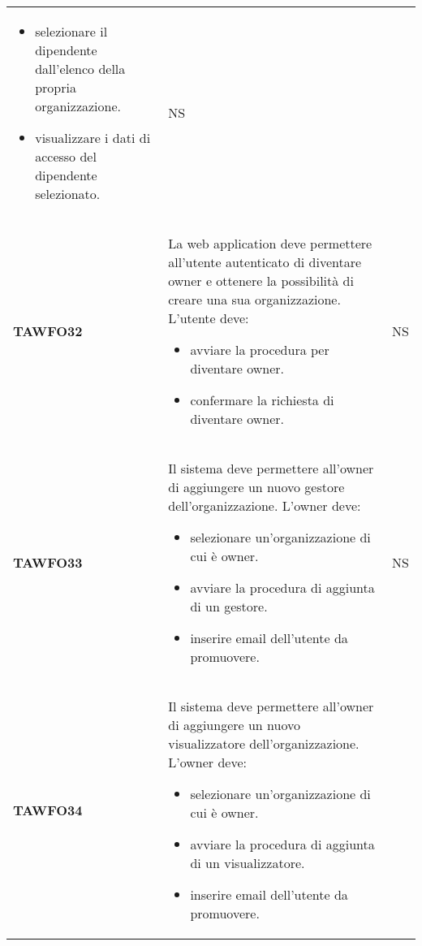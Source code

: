 \documentclass[../piano-di-qualifica.tex]{subfiles}
\begin{document}
\begin{centering}
\begin{longtable}[H]{>{\centering\bfseries}m{3cm} >{}p{10cm} >{\centering\arraybackslash}m{3cm}}
                        \begin{itemize}
                          \item selezionare il dipendente dall'elenco della propria organizzazione.
                          \item visualizzare i dati di accesso del dipendente selezionato.
                        \end{itemize}
                      & NS \\
        TAWFO32       & La web application deve permettere all'utente autenticato di diventare owner e ottenere la possibilità di creare una sua organizzazione. \newline
                        L'utente deve:
                        \begin{itemize}
                          \item avviare la procedura per diventare owner.
                          \item confermare la richiesta di diventare owner.
                        \end{itemize}
                      & NS \\
        TAWFO33       & Il sistema deve permettere all'owner di aggiungere un nuovo gestore dell'organizzazione. \newline
                        L'owner deve:
                        \begin{itemize}
                          \item selezionare un'organizzazione di cui è owner.
                          \item avviare la procedura di aggiunta di un gestore.
                          \item inserire email dell'utente da promuovere.
                        \end{itemize}
                      & NS \\
        TAWFO34       & Il sistema deve permettere all'owner di aggiungere un nuovo visualizzatore dell'organizzazione. \newline
                        L'owner deve:
                        \begin{itemize}
                          \item selezionare un'organizzazione di cui è owner.
                          \item avviare la procedura di aggiunta di un visualizzatore.
                          \item inserire email dell'utente da promuovere.

\end{itemize}
\end{longtable}
\end{centering}
\end{document}
